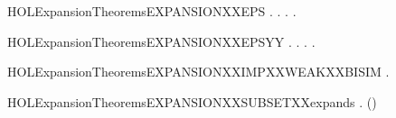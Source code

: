 \newcommand{\HOLExpansionTheoremsEXPANSIONXXALT}{\UseVerbatim{HOLExpansionTheoremsEXPANSIONXXALT}}
\begin{SaveVerbatim}{HOLExpansionTheoremsEXPANSIONXXEPS}
\HOLTokenTurnstile{} \HOLSymConst{\HOLTokenForall{}}.
         \HOLSymConst{\HOLTokenImp{}}
       \HOLSymConst{\HOLTokenForall{}} .
              \HOLSymConst{\HOLTokenImp{}} \HOLSymConst{\HOLTokenForall{}}.    \HOLSymConst{\HOLTokenImp{}} \HOLSymConst{\HOLTokenExists{}}.    \HOLSymConst{\HOLTokenConj{}}   
\end{SaveVerbatim}
\newcommand{\HOLExpansionTheoremsEXPANSIONXXEPS}{\UseVerbatim{HOLExpansionTheoremsEXPANSIONXXEPS}}
\begin{SaveVerbatim}{HOLExpansionTheoremsEXPANSIONXXEPSYY}
\HOLTokenTurnstile{} \HOLSymConst{\HOLTokenForall{}}.
         \HOLSymConst{\HOLTokenImp{}}
       \HOLSymConst{\HOLTokenForall{}} .
              \HOLSymConst{\HOLTokenImp{}} \HOLSymConst{\HOLTokenForall{}}.    \HOLSymConst{\HOLTokenImp{}} \HOLSymConst{\HOLTokenExists{}}.    \HOLSymConst{\HOLTokenConj{}}   
\end{SaveVerbatim}
\newcommand{\HOLExpansionTheoremsEXPANSIONXXEPSYY}{\UseVerbatim{HOLExpansionTheoremsEXPANSIONXXEPSYY}}
\begin{SaveVerbatim}{HOLExpansionTheoremsEXPANSIONXXIMPXXWEAKXXBISIM}
\HOLTokenTurnstile{} \HOLSymConst{\HOLTokenForall{}}.   \HOLSymConst{\HOLTokenImp{}}  
\end{SaveVerbatim}
\newcommand{\HOLExpansionTheoremsEXPANSIONXXIMPXXWEAKXXBISIM}{\UseVerbatim{HOLExpansionTheoremsEXPANSIONXXIMPXXWEAKXXBISIM}}
\begin{SaveVerbatim}{HOLExpansionTheoremsEXPANSIONXXSUBSETXXexpands}
\HOLTokenTurnstile{} \HOLSymConst{\HOLTokenForall{}}.   \HOLSymConst{\HOLTokenImp{}}   ()
\end{SaveVerbatim}
